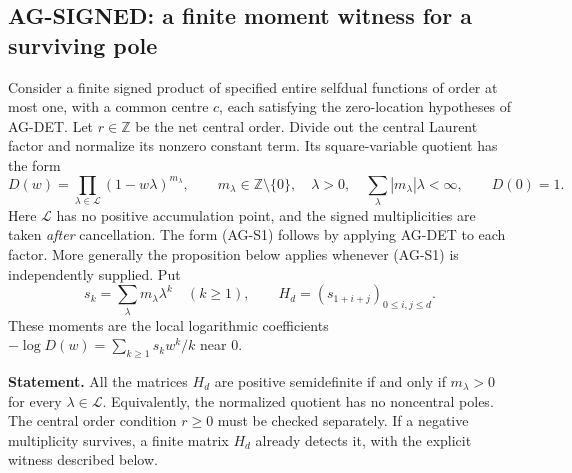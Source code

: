 \documentclass[11pt,a4paper]{article}
\begin{document}
\subsection{AG-SIGNED: a finite moment witness for a surviving pole}
\label{ag:signed}

Consider a finite signed product of specified entire selfdual functions
of order at most one, with a common centre $c$, each satisfying the
zero-location hypotheses of AG-DET. Let $r\in\mathbb Z$ be the net
central order. Divide out the central Laurent factor and normalize its
nonzero constant term. Its square-variable quotient has the form
\[
 D(w)=\prod_{\lambda\in\mathcal L}(1-w\lambda)^{m_\lambda},
 \qquad m_\lambda\in\mathbb Z\setminus\{0\},\quad
 \lambda>0,\quad \sum_\lambda |m_\lambda|\lambda<\infty,
 \qquad D(0)=1.                                      \tag{AG-S1}
\]
Here $\mathcal L$ has no positive accumulation point, and the signed
multiplicities are taken \emph{after} cancellation. The form (AG-S1)
follows by applying AG-DET to each factor. More generally the proposition
below applies whenever (AG-S1) is independently supplied. Put
\[
 s_k=\sum_\lambda m_\lambda\lambda^k\quad(k\ge1),\qquad
 H_d=(s_{1+i+j})_{0\le i,j\le d}.
\]
These moments are the local logarithmic coefficients
$-\log D(w)=\sum_{k\ge1}s_kw^k/k$ near $0$.

\textbf{Statement.} All the matrices $H_d$ are positive semidefinite
if and only if $m_\lambda>0$ for every $\lambda\in\mathcal L$.
Equivalently, the normalized quotient has no noncentral poles. The
central order condition $r\ge0$ must be checked separately. If a
negative multiplicity survives, a finite matrix $H_d$ already detects it,
with the explicit witness described below.
\end{document}
